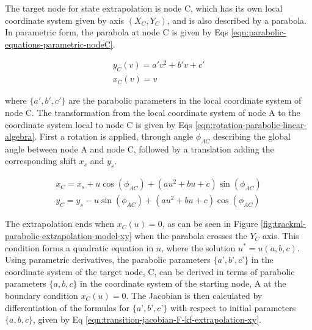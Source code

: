 The target node for state extrapolation is node C, which has its own local coordinate system given by axis $(X_C, Y_C)$, and is also described by a parabola. In parametric form, the parabola at node C is given by Eqs \eqref{eqn:parabolic-equations-parametric-nodeC}.

\begin{equation}
\begin{aligned}
y_C(v) = a'v^{2} + b'v + c' \\
x_C(v) = v
\end{aligned}
\label{eqn:parabolic-equations-parametric-nodeC}
\end{equation}

where $\{a', b', c' \}$ are the parabolic parameters in the local coordinate system of node C. The transformation from the local coordinate system of node A to the coordinate system local to node C is given by Eqs \eqref{eqn:rotation-parabolic-linear-algebra}. First a rotation is applied, through angle $\phi_{AC}$ describing the global angle between node A and node C, followed by a translation adding the corresponding shift $x_s$ and $y_s$.

\begin{equation}
\begin{aligned}
x_C = x_s + u\cos(\phi_{AC}) + (au^2 + bu + c)\sin(\phi_{AC}) \\
y_C = y_s - u\sin(\phi_{AC}) + (au^2 + bu + c)\cos(\phi_{AC})
\end{aligned}
\label{eqn:rotation-parabolic-linear-algebra}
\end{equation}


The extrapolation ends when $x_C(u) = 0$, as can be seen in Figure \ref{fig:trackml-parabolic-extrapolation-model-xy} when the parabola crosses the $Y_C$ axis. This condition forms a quadratic equation in $u$, where the solution $u^{*} = u(a, b, c)$. Using parametric derivatives, the parabolic parameters $\{a’, b’, c’ \}$ in the coordinate system of the target node, C, can be derived in terms of parabolic parameters $\{a, b, c \}$ in the coordinate system of the starting node, A at the boundary condition $x_C(u) = 0$. The Jacobian is then calculated by differentiation of the formulas for $\{a’, b’, c’ \}$ with respect to initial parameters $\{a, b, c \}$, given by Eq \eqref{eqn:transition-jacobian-F-kf-extrapolation-xy}.  




